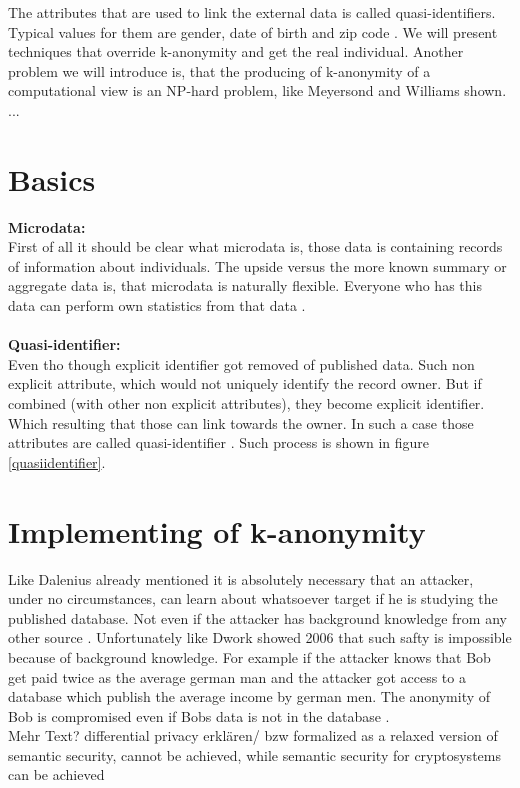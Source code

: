 \documentclass{llncs}
\begin{document}
The attributes that are used to link the external data is called quasi-identifiers. Typical values for them are gender, date of birth and zip code \cite{ldiversity}. 
We will present techniques that override k-anonymity and get the real individual. Another problem we will introduce is, that the producing of k-anonymity of a computational view is an NP-hard problem, like Meyersond and Williams shown.
...
\newpage
\section{Basics}
\textbf{Microdata:}\\
First of all it should be clear what microdata is, those data is containing records of information about individuals. The upside versus the more known summary or aggregate data is, that microdata is naturally  flexible. Everyone who has this data can perform own statistics from that data \cite{microdataweb}.\\
\\
\textbf{Quasi-identifier:}\\
Even tho though explicit identifier got removed of published data. Such non explicit attribute, which would not uniquely identify the record owner. But if combined (with other non explicit attributes), they become explicit identifier. Which resulting that those can link towards the owner. In such a case those attributes are called quasi-identifier \cite{dalenius1986finding}. Such process is shown in figure \ref{quasiidentifier}. 


\section{Implementing of k-anonymity}

Like Dalenius already mentioned it is absolutely necessary that an attacker, under no circumstances, can learn about whatsoever target if he is studying the published database. Not even if the attacker has background knowledge from any other source  \cite{Dalenius1977}. Unfortunately like Dwork showed 2006 that such safty is impossible because of background knowledge. For example if the attacker knows that Bob get paid twice as the average german man and the attacker got access to a database which publish the average income by german men. The anonymity of Bob is compromised even if Bobs data is not in the database \cite{dwork2011differential}.  
\newline \\ Mehr Text? differential privacy erklären/ bzw formalized as a relaxed version of semantic security, cannot be achieved, while semantic security for cryptosystems can be achieved
\end{document}
